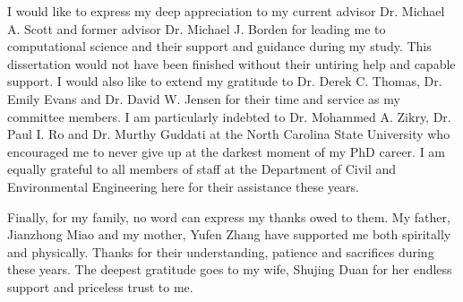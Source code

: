 \afterpage{\cleardoublepage}
%

I would like to express my deep appreciation to my current advisor Dr. Michael A. Scott and former advisor Dr. Michael J. Borden for leading me to computational science and their support and guidance during my study. This dissertation would not have been finished without their untiring help and capable support. I would also like to extend my gratitude to Dr. Derek C. Thomas, Dr. Emily Evans and Dr. David W. Jensen for their time and service as my committee members. I am particularly indebted to Dr. Mohammed A. Zikry, Dr. Paul I. Ro and Dr. Murthy Guddati at the North Carolina State University who encouraged me to never give up at the darkest moment of my PhD career. I am equally grateful to all members of staff at the Department of Civil and Environmental Engineering here for their assistance these years. \par

Finally, for my family, no word can express my thanks owed to them. My father, Jianzhong Miao and my mother, Yufen Zhang have supported me both spiritally and physically. Thanks for their understanding, patience and sacrifices during these years. The deepest gratitude goes to my wife, Shujing Duan for her endless support and priceless trust to me.